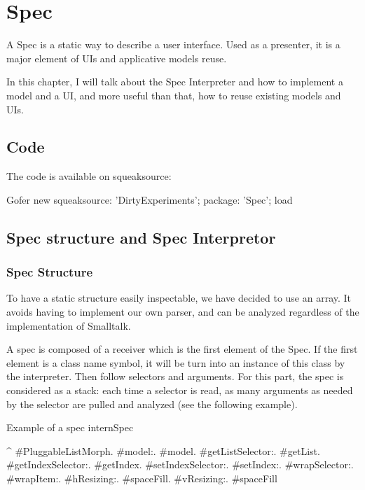\documentclass[a4paper,10pt,twoside]{book}
\begin{document}
\fi
\sloppy

\chapter{Spec}

A Spec is a static way to describe a user interface. Used as a presenter, it is a major element of UIs and applicative models reuse.

In this chapter, I will talk about the Spec Interpreter and how to implement a model and a UI, and more useful than that, how to reuse existing models and UIs.

\section{Code}

The code is available on squeaksource:
\begin{code}{}
Gofer new
	squeaksource: 'DirtyExperiments';
	package: 'Spec';
	load
\end{code}

\section{Spec structure and Spec Interpretor}

\subsection{Spec Structure}

To have a static structure easily inspectable, we have decided to use an array. It avoids having to implement our own parser, and can be analyzed regardless of the implementation of Smalltalk.

A spec is composed of a receiver which is the first element of the Spec. If the first element is a class name symbol, it will be turn into an instance of this class by the interpreter. Then follow selectors and arguments. For this part, the spec is considered as a stack: each time a selector is read, as many arguments as needed by the selector are pulled and analyzed (see the following example).

\begin{method}{Example of a spec}
internSpec

	^ {#PluggableListMorph.
	    	#model:.			  	  #model.
			#getListSelector:.	  #getList.
			#getIndexSelector:.	#getIndex.
			#setIndexSelector:.	#setIndex:.
			#wrapSelector:.	  	 #wrapItem:.
			#hResizing:.			#spaceFill.
			#vResizing:.			#spaceFill		}
\end{method} 
\end{document}
